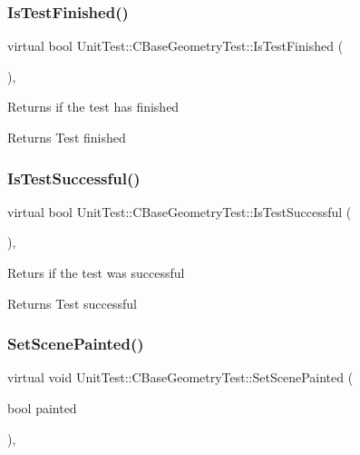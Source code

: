 \subsubsection{\texorpdfstring{IsTestFinished()}{IsTestFinished()}}
{\footnotesize\ttfamily virtual bool Unit\+Test\+::\+C\+Base\+Geometry\+Test\+::\+Is\+Test\+Finished (\begin{DoxyParamCaption}{ }\end{DoxyParamCaption})\hspace{0.3cm}{\ttfamily [inline]}, {\ttfamily [virtual]}}

Returns if the test has finished \begin{DoxyReturn}{Returns}
Test finished 
\end{DoxyReturn}
\mbox{\label{class_unit_test_1_1_c_base_geometry_test_aa824a0d8affc72e8bc68616dc38f0961}} 
\subsubsection{\texorpdfstring{IsTestSuccessful()}{IsTestSuccessful()}}
{\footnotesize\ttfamily virtual bool Unit\+Test\+::\+C\+Base\+Geometry\+Test\+::\+Is\+Test\+Successful (\begin{DoxyParamCaption}{ }\end{DoxyParamCaption})\hspace{0.3cm}{\ttfamily [inline]}, {\ttfamily [virtual]}}

Returs if the test was successful \begin{DoxyReturn}{Returns}
Test successful 
\end{DoxyReturn}
\mbox{\label{class_unit_test_1_1_c_base_geometry_test_a394a19d424a416ade87e4d09978337bf}} 
\subsubsection{\texorpdfstring{SetScenePainted()}{SetScenePainted()}}
{\footnotesize\ttfamily virtual void Unit\+Test\+::\+C\+Base\+Geometry\+Test\+::\+Set\+Scene\+Painted (\begin{DoxyParamCaption}\item[{bool}]{painted }\end{DoxyParamCaption})\hspace{0.3cm}{\ttfamily [inline]}, {\ttfamily [virtual]}}

